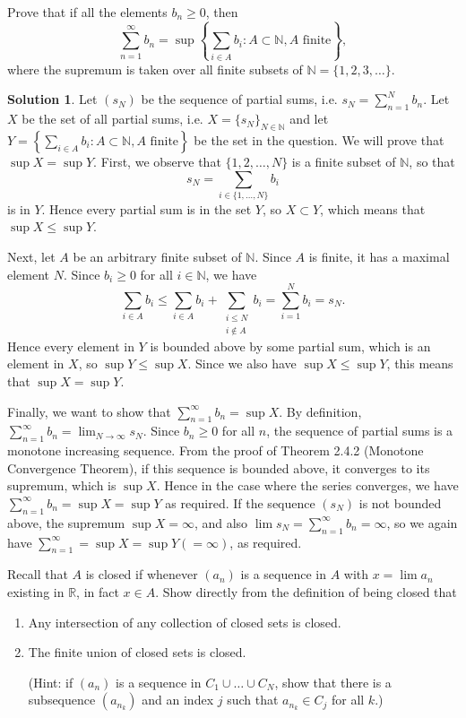 \documentclass[12pt]{article}
\theoremstyle{definition}
\theoremstyle{definition}
\newtheorem*{soln}{Solution}
\newcommand{\N}{\mathbb{N}}
\newcommand{\R}{\mathbb{R}}
\let\i\relax
\newcommand{\i}{\mathbf{i}}
\begin{document}
\break

\begin{prob}
Prove that if all the elements $b_n\geq 0$, then
\[\sum_{n=1}^\infty b_n=\sup\left\{\sum_{i\in A}b_i:A\subset\N, A \text{ finite}\right\},\]
where the supremum is taken over all finite subsets of $\N=\{1,2,3,\dots\}$.
\end{prob}

\begin{soln}
Let $(s_N)$ be the sequence of partial sums, i.e. $s_N=\sum_{n=1}^N b_n$. Let $X$ be the set of all partial sums, i.e. $X=\{s_N\}_{N\in\N}$ and let $Y=\left\{\sum_{i\in A}b_i:A\subset\N, A \text{ finite}\right\}$ be the set in the question. We will prove that $\sup X=\sup Y$. First, we observe that $\{1,2,\dots,N\}$ is a finite subset of $\N$, so that
\[s_N = \sum_{i\in\{1,\dots,N\}} b_i\]
is in $Y$. Hence every partial sum is in the set $Y$, so $X\subset Y$, which means that $\sup X\leq \sup Y$.

Next, let $A$ be an arbitrary finite subset of $\N$. Since $A$ is finite, it has a maximal element $N$. Since $b_i\geq 0$ for all $i\in\N$, we have
\[\sum_{i\in A} b_i\leq \sum_{i\in A}b_i+\sum_{\substack{i\leq N\\i\notin A}} b_i = \sum_{i=1}^N b_i = s_N.\]
Hence every element in $Y$ is bounded above by some partial sum, which is an element in $X$, so $\sup Y\leq \sup X$. Since we also have $\sup X\leq \sup Y$, this means that $\sup X=\sup Y$.

Finally, we want to show that $\sum_{n=1}^\infty b_n=\sup X$. By definition, $\sum_{n=1}^\infty b_n=\lim_{N\to\infty} s_N$. Since $b_n\geq 0$ for all $n$, the sequence of partial sums is a monotone increasing sequence. From the proof of Theorem 2.4.2 (Monotone Convergence Theorem), if this sequence is bounded above, it converges to its supremum, which is $\sup X$. Hence in the case where the series converges, we have $\sum_{n=1}^\infty b_n =\sup X=\sup Y$ as required. If the sequence $(s_N)$ is not bounded above, the supremum $\sup X=\infty$, and also $\lim s_N=\sum_{n=1}^\infty b_n=\infty$, so we again have $\sum_{n=1}^\infty =\sup X=\sup Y (=\infty)$, as required.
\end{soln}


\break

\begin{prob}
Recall that $A$ is closed if whenever $(a_n)$ is a sequence in $A$ with $x=\lim a_n$ existing in $\R$, in fact $x\in A$.  Show directly from the definition of being closed that
\begin{enumerate}[label=(\alph*)]
\item Any intersection of any collection of closed sets is closed.

\item The finite union of closed sets is closed. 

{\small (Hint: if $(a_n)$ is a sequence in $C_1\cup\dots\cup C_N$, show that there is a subsequence $(a_{n_k})$ and an index $j$ such that $a_{n_k}\in C_j$ for all $k$.)}
\end{enumerate}
\end{prob}
\end{document}

